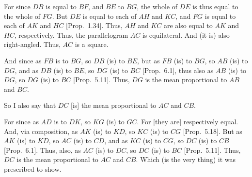 \begin{Parallel}{}{}
{\epsfysize=1.7in
\centerline{}

For since $DB$ is equal to $BF$, and $BE$ to $BG$, the whole of $DE$
is thus equal to the whole of $FG$. But $DE$ is equal to each of $AH$
and $KC$, and $FG$ is equal to each of $AK$ and $HC$ [Prop.~1.34]. Thus, $AH$ and $KC$ are also 
equal to  $AK$ and $HC$, respectively. Thus, the parallelogram $AC$
is equilateral. And (it is) also right-angled. Thus, $AC$ is a square.

And since as $FB$ is to $BG$, so $DB$ (is) to $BE$, but as $FB$
(is) to $BG$, so $AB$ (is) to $DG$, and as $DB$ (is) to $BE$, so
$DG$ (is) to $BC$ [Prop.~6.1], thus also as $AB$ (is) to $DG$, so $DG$  (is) to $BC$ [Prop.~5.11]. Thus, $DG$ is the mean proportional
to $AB$ and $BC$.

So I also say that $DC$ [is] the mean proportional to $AC$ and $CB$.

For since as $AD$ is to $DK$, so $KG$ (is) to $GC$. For [they are]  respectively equal. And, via composition, as $AK$ (is) to $KD$, so
$KC$ (is) to $CG$ [Prop.~5.18]. But as
$AK$ (is) to $KD$, so $AC$ (is) to $CD$, and as $KC$ (is) to $CG$,
so $DC$ (is) to $CB$ [Prop.~6.1]. Thus, also, as $AC$ (is) to $DC$, so
$DC$ (is) to $BC$ [Prop.~5.11]. Thus, $DC$ is the mean proportional to $AC$ and
$CB$. Which (is the very thing) it was prescribed to show.}
\end{Parallel}

